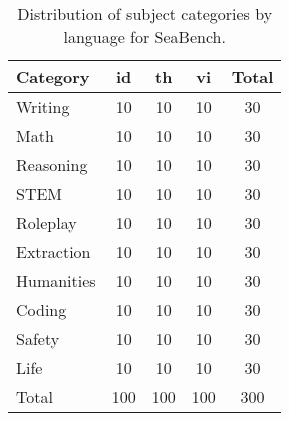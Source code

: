 \begin{table}[h!]
\centering
\small
\begin{tabular}{lcccc}
\toprule
\textbf{Category}   & \textbf{id} & \textbf{th} & \textbf{vi} & \textbf{Total} \\
\midrule
        Writing & 10 & 10 & 10 & 30 \\ 
        Math & 10 & 10 & 10 & 30 \\ 
        Reasoning & 10 & 10 & 10 & 30 \\ 
        STEM & 10 & 10 & 10 & 30 \\ 
        Roleplay & 10 & 10 & 10 & 30 \\ 
        Extraction & 10 & 10 & 10 & 30 \\ 
        Humanities & 10 & 10 & 10 & 30 \\ 
        Coding & 10 & 10 & 10 & 30 \\ 
        Safety & 10 & 10 & 10 & 30 \\ 
        Life & 10 & 10 & 10 & 30 \\ 
        \midrule
        Total & 100 & 100 & 100 & 300 \\ 
\bottomrule
\end{tabular}
\caption{Distribution of subject categories by language for SeaBench.}
\label{tab:stats_seabench}
\end{table}